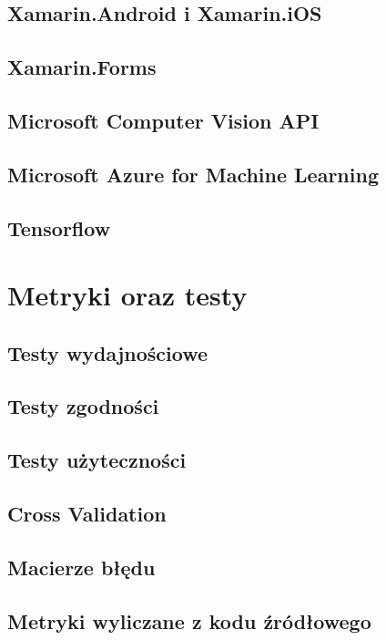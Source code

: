\documentclass[brudnopis]{xmgr}
\begin{document}
\section{Xamarin.Android i Xamarin.iOS}

\section{Xamarin.Forms}

\section{Microsoft Computer Vision API}

\section{Microsoft Azure for Machine Learning}

\section{Tensorflow}

\chapter{Metryki oraz testy}

\section{Testy wydajnościowe}

\section{Testy zgodności}

\section{Testy użyteczności}

\section{Cross Validation}

\section{Macierze błędu}

\section{Metryki wyliczane z kodu źródłowego}
\end{document}
